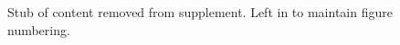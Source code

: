 \begin{figure}

% 
% 

\caption{
Stub of content removed from supplement.
Left in to maintain figure numbering.
}
\label{fig:fitness_complexity_alt}

\end{figure}
